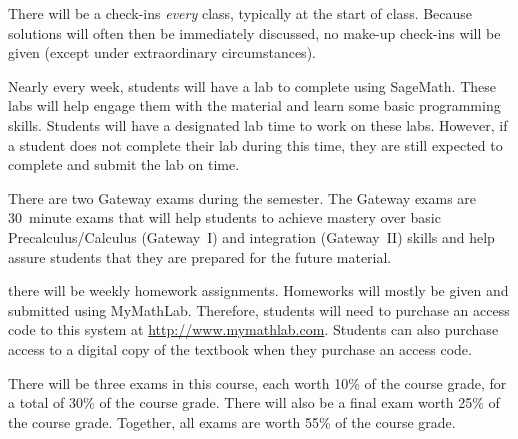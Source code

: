 \documentclass[11pt,letterpaper]{article}
\begin{document}
There will be a check-ins \textit{every} class, typically at the start of class. Because solutions will often then be immediately discussed, no make-up check-ins will be given (except under extraordinary circumstances). \pspace


Nearly every week, students will have a lab to complete using SageMath. These labs will help engage them with the material and learn some basic programming skills. Students will have a designated lab time to work on these labs. However, if a student does not complete their lab during this time, they are still expected to complete and submit the lab on time.
\pspace


There are two Gateway exams during the semester. The Gateway exams are 30~minute exams that will help students to achieve mastery over basic Precalculus/Calculus (Gateway~I) and integration (Gateway~II) skills and help assure students that they are prepared for the future material. 
\pspace



\newpage



there will be weekly homework assignments. Homeworks will mostly be given and submitted using MyMathLab. Therefore, students will need to purchase an access code to this system at \url{http://www.mymathlab.com}. Students can also purchase access to a digital copy of the textbook when they purchase an access code.
\pspace


There will be three exams in this course, each worth 10\% of the course grade, for a total of 30\% of the course grade. There will also be a final exam worth 25\% of the course grade. Together, all exams are worth 55\% of the course grade. 
\pspace
\end{document}
